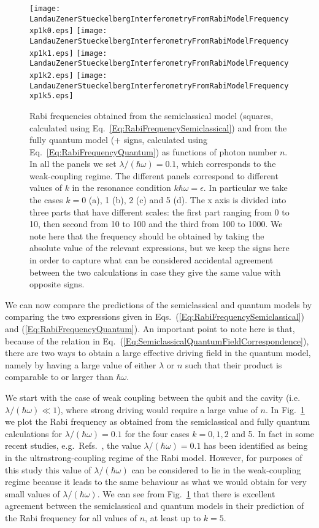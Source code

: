 \documentclass[aps,twocolumn,superscriptaddress]{revtex4}
\begin{document}
\begin{figure}[h]
\texttt{[image: LandauZenerStueckelbergInterferometryFromRabiModelFrequencyxp1k0.eps]}
\texttt{[image: LandauZenerStueckelbergInterferometryFromRabiModelFrequencyxp1k1.eps]}
\texttt{[image: LandauZenerStueckelbergInterferometryFromRabiModelFrequencyxp1k2.eps]}
\texttt{[image: LandauZenerStueckelbergInterferometryFromRabiModelFrequencyxp1k5.eps]}
\caption{Rabi frequencies obtained from the semiclassical model (squares, calculated using Eq.~\ref{Eq:RabiFrequencySemiclassical}) and from the fully quantum model (+ signs, calculated using Eq.~\ref{Eq:RabiFrequencyQuantum}) as functions of photon number $n$. In all the panels we set $\lambda/(\hbar\omega)=0.1$, which corresponds to the weak-coupling regime. The different panels correspond to different values of $k$ in the resonance condition $k\hbar\omega=\epsilon$. In particular we take the cases $k=0$ (a), 1 (b), 2 (c) and 5 (d). The x axis is divided into three parts that have different scales: the first part ranging from 0 to 10, then second from 10 to 100 and the third from 100 to 1000. We note here that the frequency should be obtained by taking the absolute value of the relevant expressions, but we keep the signs here in order to capture what can be considered accidental agreement between the two calculations in case they give the same value with opposite signs.}
%
\label{Fig:RabiFrequencyWeakCoupling}
\end{figure}

We can now compare the predictions of the semiclassical and quantum models by comparing the two expressions given in Eqs.~(\ref{Eq:RabiFrequencySemiclassical}) and (\ref{Eq:RabiFrequencyQuantum}). An important point to note here is that, because of the relation in Eq.~(\ref{Eq:SemiclassicalQuantumFieldCorrespondence}), there are two ways to obtain a large effective driving field in the quantum model, namely by having a large value of either $\lambda$ or $n$ such that their product is comparable to or larger than $\hbar\omega$.

We start with the case of weak coupling between the qubit and the cavity (i.e.~$\lambda/(\hbar\omega)\ll 1$), where strong driving would require a large value of $n$. In Fig.~\ref{Fig:RabiFrequencyWeakCoupling} we plot the Rabi frequency as obtained from the semiclassical and fully quantum calculations for $\lambda/(\hbar\omega)=0.1$ for the four cases $k=0,1,2$ and 5. In fact in some recent studies, e.g.~Refs.~\cite{Niemczyk,FornDiaz2010}, the value $\lambda/(\hbar\omega)=0.1$ has been identified as being in the ultrastrong-coupling regime of the Rabi model. However, for purposes of this study this value of $\lambda/(\hbar\omega)$ can be considered to lie in the weak-coupling regime because it leads to the same behaviour as what we would obtain for very small values of $\lambda/(\hbar\omega)$. We can see from Fig.~\ref{Fig:RabiFrequencyWeakCoupling} that there is excellent agreement between the semiclassical and quantum models in their prediction of the Rabi frequency for all values of $n$, at least up to $k=5$.
\end{document}
